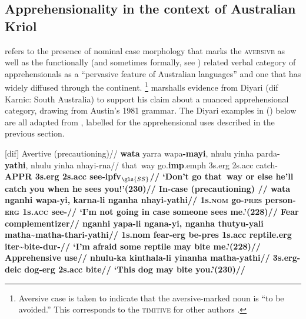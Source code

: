 \subsection{Apprehensionality in the context of Australian Kriol}



\citet[171]{Dixon2002a} refers to the presence of nominal case morphology that marks the \textsc{aversive} as well as the functionally (and sometimes formally, see \citealp[44]{Blake1993}) related verbal category of apprehensionals as a ``pervasive feature of Australian languages'' and one that has widely diffused through the continent.%
\footnote{Aversive case is taken to indicate that the aversive-marked noun is ``to be avoided.'' This corresponds to the \textsc{timitive} for other authors \citep[\textit{e.g.},][]{Vuillermet2018,AnderBois2020}.} \citet[306]{Lichtenberk1995} marshalls evidence from Diyari (\gls{dif} Karnic: South Australia) to support his claim about a nuanced apprehensional category, drawing from Austin's 1981 grammar. The Diyari examples in (\nextx) below are all adapted from \citet{Austin2011}, labelled for the apprehensional uses described in the previous section.

\pex {} [\gls{dif}] \a\begingl\glpreamble Avertive (precautioning)//
\gla \textbf{wata} yarra wapa\textbf{-mayi}, nhulu yinha parda-\textbf{yathi}, nhulu yinha nhayi-rna//
 that~way go.\textbf{\gls{imp}}.\gls{emph} 3s{\sc.erg} 2s{\sc.acc} catch-\bfseries{{\footnotesize APPR}} 3s{\sc.erg} 2s{\sc.acc} see-{\sc ipfv$_{\gls{SS}}$}//
\glft `Don't go that~way or else he'll catch you when he sees you!'\hfill(230)//
\endgl
\a\begingl\glpreamble In-case (precautioning) //
\gla \textbf{wata} nganhi wapa-yi, karna-li nganha nhayi-\textbf{yathi}//
 1s\textsc{.nom} go\textsc{-pres} person-\textsc{erg} 1s\textsc{.acc} see-{}//
\glft ‘I’m not going in case someone sees me.’\hfill(228)//
\endgl
\a\begingl\glpreamble Fear complementizer//
\gla nganhi \textbf{yapa}-li ngana-yi, nganha thutyu-yali matha\textasciitilde{}matha-thari-\textbf{yathi}//
\glb 1s{\sc.nom} \textbf{fear}{\sc-erg} be{\sc-pres} 1s{\sc.acc} reptile{\sc.erg} \gls{iter}\textasciitilde{}bite-\gls{dur}-//
\glft `I'm afraid some reptile may bite me.'\hfill(228)//\endgl
\a\begingl\glpreamble Apprehensive use//
\gla nhulu-ka kinthala-li yinanha matha-\textbf{yathi}//
\glb 3s.\gls{erg}-\gls{deic} dog{\sc-erg} 2s{\sc.acc} bite//
\glft `This dog may bite you.'\hfill(230)//
\endgl
\xe

